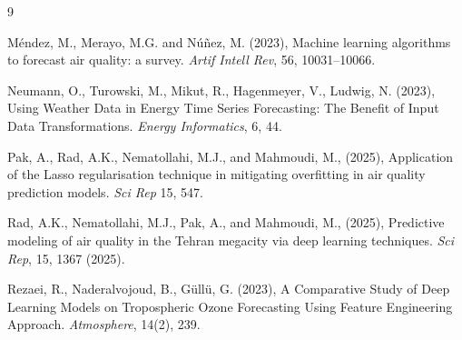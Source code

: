\documentclass[twoside]{article}
\begin{document}



\begin{thebibliography}{9}


Méndez, M., Merayo, M.G. and Núñez, M. (2023), Machine learning algorithms to forecast air quality: a survey. {\it Artif Intell Rev}, 56, 10031–10066.


Neumann, O., Turowski, M., Mikut, R., Hagenmeyer, V.,  Ludwig, N. (2023),
Using Weather Data in Energy Time Series Forecasting: The Benefit of Input Data Transformations.
{\it Energy Informatics}, 6, 44.

Pak, A., Rad, A.K., Nematollahi, M.J., and Mahmoudi, M., (2025), Application of the Lasso regularisation technique in mitigating overfitting in air quality prediction models. {\it Sci Rep} 15, 547. 

Rad, A.K., Nematollahi, M.J., Pak, A., and Mahmoudi, M., (2025), Predictive modeling of air quality in the Tehran megacity via deep learning techniques. {\it Sci Rep}, 15, 1367 (2025).

Rezaei, R., Naderalvojoud, B.,  Güllü, G. (2023),
A Comparative Study of Deep Learning Models on Tropospheric Ozone Forecasting Using Feature Engineering Approach.
{\it Atmosphere}, 14(2), 239.




\end{thebibliography}
 
\end{document}
